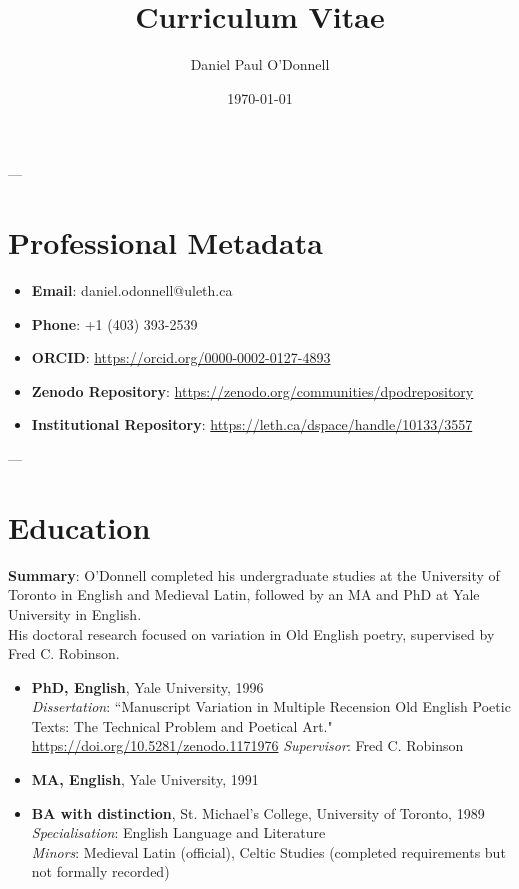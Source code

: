 \documentclass[12pt]{article}
\title{Curriculum Vitae}
\author{Daniel Paul O'Donnell}
\date{\today}
\begin{document}
\maketitle



---

\section*{Professional Metadata}
\begin{itemize}
  \item \textbf{Email}: daniel.odonnell@uleth.ca
  \item \textbf{Phone}: +1 (403) 393-2539
  \item \textbf{ORCID}: \url{https://orcid.org/0000-0002-0127-4893}
  \item \textbf{Zenodo Repository}: \url{https://zenodo.org/communities/dpodrepository}
  \item \textbf{Institutional Repository}: \url{https://leth.ca/dspace/handle/10133/3557}
\end{itemize}


---
\section*{Education}

\textbf{Summary}: O'Donnell completed his undergraduate studies at the University of Toronto in English and Medieval Latin, followed by an MA and PhD at Yale University in English.\\ His doctoral research focused on variation in Old English poetry, supervised by Fred C. Robinson.

\begin{itemize}[itemsep=6pt, topsep=0pt, leftmargin=*]
  \item {
    \textbf{PhD, English}, Yale University, 1996\\
    \textit{Dissertation}: “Manuscript Variation in Multiple Recension Old English Poetic Texts: The Technical Problem and Poetical Art."  \url{https://doi.org/10.5281/zenodo.1171976}
    \textit{Supervisor}: Fred C. Robinson
  }
  \item \textbf{MA, English}, Yale University, 1991

  \item {
    \textbf{BA with distinction}, St. Michael’s College, University of Toronto, 1989\\
    \textit{Specialisation}: English Language and Literature\\
    \textit{Minors}: Medieval Latin (official), Celtic Studies (completed requirements but not formally recorded)
  }
\end{itemize}
\end{document}
